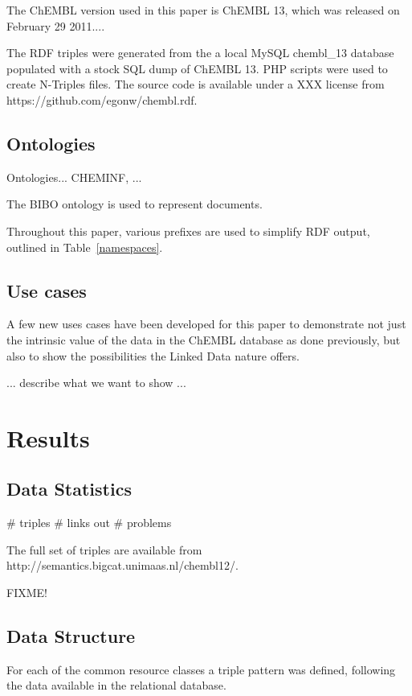 \documentclass[sw]{iosart2c}
\begin{document}
The ChEMBL version used in this paper is ChEMBL 13, which was released on February 29 2011....

The RDF triples were generated from the a local MySQL chembl\_13 database populated with a stock
SQL dump of ChEMBL 13. PHP scripts were used to create N-Triples files. The source code is
available under a XXX license from https://github.com/egonw/chembl.rdf.

\subsection{Ontologies}

Ontologies... CHEMINF, ...

The BIBO ontology is used to represent documents.

Throughout this paper, various prefixes are used to simplify RDF output, outlined
in Table~\ref{namespaces}.

\subsection{Use cases}

A few new uses cases have been developed for this paper to demonstrate not just the intrinsic
value of the data in the ChEMBL database as done previously, but also to show the possibilities
the Linked Data nature offers.

... describe what we want to show ...

\section{Results}\label{s3}

\subsection{Data Statistics}

\# triples
\# links out
\# problems

The full set of triples are available from http://semantics.bigcat.unimaas.nl/chembl12/.

FIXME!

\subsection{Data Structure}

For each of the common resource classes a triple pattern was defined, following the
data available in the relational database.
\end{document}
